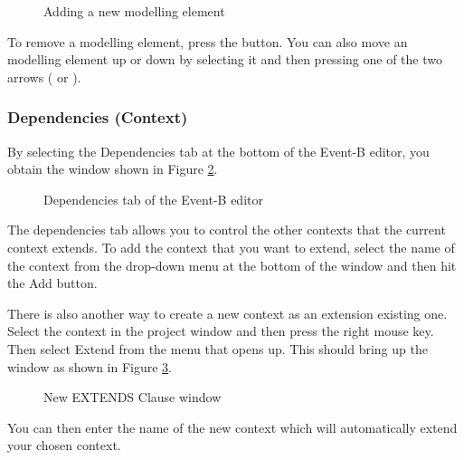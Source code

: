 \begin{figure}[!ht]
\begin{center}
	\caption{Adding a new modelling element}
	\label{fig_ref_01_eventb_editor3}
\end{center}
\end{figure}

To remove a modelling element, press the  button. You can also move an modelling element up or down by selecting it and then pressing one of the two arrows ( or ).

\subsubsection{Dependencies (Context)}

By selecting the \textsf{Dependencies} tab at the bottom of the Event-B editor, you obtain the window shown in Figure \ref{fig_ref_01_eventb_editor8}.

\begin{figure}[!ht]
\begin{center}
	\caption{Dependencies tab of the Event-B editor}
	\label{fig_ref_01_eventb_editor8}
\end{center}
\end{figure}

The dependencies tab allows you to control the other contexts that the current context extends. To add the context that you want to extend, select the name of the context from the drop-down menu at the bottom of the window and then hit the \textsf{Add} button.

There is also another way to create a new context as an extension existing one. Select the context in the project window and then press the right mouse key. Then select \textsf{Extend} from the menu that opens up. This should bring up the window as shown in Figure \ref{fig_ref_01_eventb_editor9}.

\begin{figure}[!ht]
\begin{center}
	\caption{New EXTENDS Clause window}
	\label{fig_ref_01_eventb_editor9}
\end{center}
\end{figure}

You can then enter the name of the new context which will automatically extend your chosen context. 

